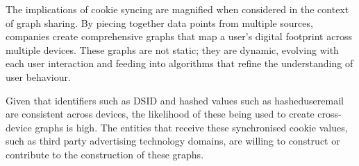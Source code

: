 The implications of cookie syncing are magnified when considered in the context of graph sharing. By piecing together data points from multiple sources, companies create comprehensive graphs that map a user's digital footprint across multiple devices. These graphs are not static; they are dynamic, evolving with each user interaction and feeding into algorithms that refine the understanding of user behaviour.

Given that identifiers such as DSID and hashed values such as hasheduseremail are consistent across devices, the likelihood of these being used to create cross-device graphs is high. The entities that receive these synchronised cookie values, such as third party advertising technology domains, are willing to construct or contribute to the construction of these graphs.